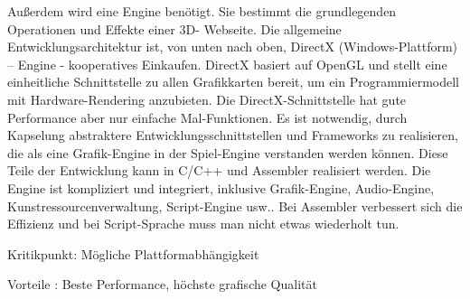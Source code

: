 Außerdem wird eine Engine benötigt. Sie bestimmt die grundlegenden Operationen und Effekte einer 3D- Webseite. Die allgemeine Entwicklungsarchitektur ist, von unten nach oben, DirectX (Windows-Plattform) – Engine - kooperatives Einkaufen. DirectX basiert auf OpenGL und  stellt eine einheitliche Schnittstelle zu allen Grafikkarten bereit, um ein Programmiermodell mit Hardware-Rendering anzubieten. Die DirectX-Schnittstelle hat gute Performance aber nur einfache Mal-Funktionen. Es ist notwendig, durch Kapselung abstraktere  Entwicklungsschnittstellen und Frameworks zu realisieren, die als eine Grafik-Engine in der Spiel-Engine verstanden werden können. Diese Teile der Entwicklung kann in C/C++ und Assembler realisiert werden. Die Engine ist kompliziert und integriert, inklusive Grafik-Engine, Audio-Engine, Kunstressourcenverwaltung, Script-Engine usw.. Bei  Assembler verbessert sich die Effizienz und bei Script-Sprache muss man nicht etwas wiederholt tun.

Kritikpunkt: Mögliche Plattformabhängigkeit

Vorteile : Beste Performance, höchste grafische Qualität
